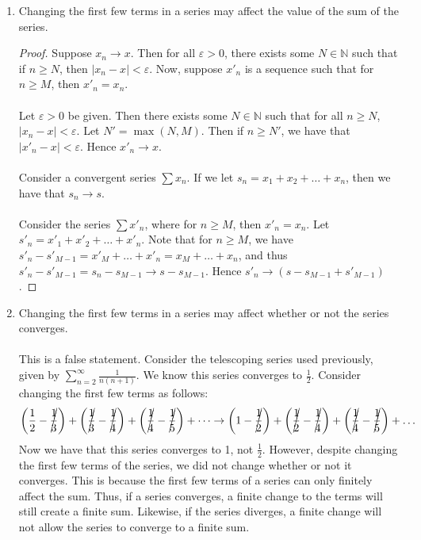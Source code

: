 \documentclass[12pt,letterpaper]{article}
\newcommand{\N}{\mathbb{N}}
\theoremstyle{case}
\theoremstyle{definition}
\begin{document}
\begin{enumerate}
\begin{enumerate}
			\item Changing the first few terms in a series may affect the value of the sum of the series.
			\begin{proof}
				Suppose $x_n \to x$. Then for all $\varepsilon >0$, there exists some $N \in \N$ such that if $n \geq N$, then $|x_n-x| < \varepsilon$. Now, suppose $x'_n$ is a sequence such that for $n \geq M$, then $x'_n=x_n$.
				\\\\Let $\varepsilon>0$ be given. Then there exists some $N \in \N$ such that for all $n \geq N$, $|x_n-x|<\varepsilon$. Let $N'=\max (N,M)$. Then if $n \geq N'$, we have that $|x'_n-x|<\varepsilon$. Hence $x'_n \to x$.
				\\\\Consider a convergent series $\sum x_n$. If we let $s_n=x_1+x_2+\dots +x_n$, then we have that $s_n \to s$.
				\\\\Consider the series $\sum x'_n$, where for $n \geq M$, then $x'_n=x_n$. Let $s'_n=x'_1+x'_2+\dots+x'_n$. Note that for $n \geq M$, we have $s'_n-s'_{M-1}=x'_M+\dots+x'_n=x_M+\dots + x_n$, and thus $s'_n-s'_{M-1}=s_n-s_{M-1}\to s-s_{M-1}$. Hence $s'_n \to (s-s_{M-1}+s'_{M-1})$.
			\end{proof}
			
			\item Changing the first few terms in a series may affect whether or not the series converges.
			\\\\This is a false statement. Consider the telescoping series used previously, given by $\displaystyle\sum_{n=2}^{\infty} \frac{1}{n(n+1)}$. We know this series converges to $\frac{1}{2}$. Consider changing the first few terms as follows: 
			\[\left(\frac{1}{2}-\cancel{\frac{1}{3}}\right) + \left(\cancel{\frac{1}{3}}-\cancel{\frac{1}{4}}\right) + \left(\cancel{\frac{1}{4}}-\cancel{\frac{1}{5}}\right) +\dots \to \left(1-\cancel{\frac{1}{2}}\right) + \left(\cancel{\frac{1}{2}}-\cancel{\frac{1}{4}}\right) + \left(\cancel{\frac{1}{4}}-\cancel{\frac{1}{5}}\right) + \dots\]
			Now we have that this series converges to 1, not $\frac{1}{2}$. However, despite changing the first few terms of the series, we did not change whether or not it converges. This is because the first few terms of a series can only finitely affect the sum. Thus, if a series converges, a finite change to the terms will still create a finite sum. Likewise, if the series diverges, a finite change will not allow the series to converge to a finite sum.\\
			

\end{enumerate}
\end{enumerate}
\end{document}
